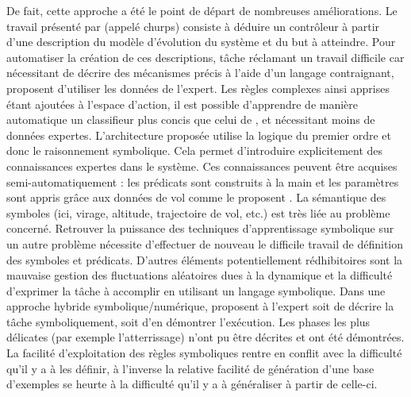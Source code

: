 \documentclass[frenchb,a4paper,justified,notoc]{tufte-book}
\begin{document}
De fait, cette approche a été le point de départ de nombreuses améliorations. Le travail présenté par \citet{stirling1995churps} (appelé \gls{churps}) consiste à déduire un contrôleur à partir d'une description du modèle d'évolution du système et du but à atteindre. Pour automatiser la création de ces descriptions, tâche réclamant un travail difficile car nécessitant de décrire des mécanismes précis à l'aide d'un langage contraignant, \citet{bain2000framework} proposent d'utiliser les données de l'expert. Les règles complexes ainsi apprises étant ajoutées à l'espace d'action, il est possible d'apprendre de manière automatique un classifieur plus concis que celui de \citet{sammut1992learning}, et nécessitant moins de données expertes. L'architecture proposée utilise la logique du premier ordre et donc le raisonnement symbolique. Cela permet d'introduire explicitement des connaissances expertes dans le système. Ces connaissances peuvent être acquises semi-automatiquement : les prédicats sont construits à la main et les paramètres sont appris grâce aux données de vol comme le proposent \citet{srinivasan1998inductive}. La sémantique des symboles (ici, virage, altitude, trajectoire de vol, etc.) est très liée au problème concerné. Retrouver la puissance des techniques d'apprentissage symbolique sur un autre problème nécessite d'effectuer de nouveau le difficile travail de définition des symboles et prédicats. D'autres éléments potentiellement rédhibitoires sont la mauvaise gestion des fluctuations aléatoires dues à la dynamique et la difficulté d'exprimer la tâche à accomplir en utilisant un langage symbolique. Dans une approche hybride symbolique/numérique, \citet{shiraz1997combining} proposent à l'expert soit de décrire la tâche symboliquement, soit d'en démontrer l'exécution. Les phases les plus délicates (par exemple l'atterrissage) n'ont pu être décrites et ont été démontrées. La facilité d'exploitation des règles symboliques rentre en conflit avec la difficulté qu'il y a à les définir, à l'inverse la relative facilité de génération d'une base d'exemples se heurte à la difficulté qu'il y a à généraliser à partir de celle-ci.
\end{document}
